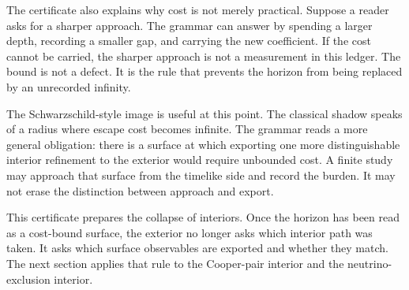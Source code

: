 The certificate also explains why cost is not merely practical. Suppose a
reader asks for a sharper approach. The grammar can answer by spending a
larger depth, recording a smaller gap, and carrying the new coefficient. If
the cost cannot be carried, the sharper approach is not a measurement in
this ledger. The bound is not a defect. It is the rule that prevents the
horizon from being replaced by an unrecorded infinity.

The Schwarzschild-style image is useful at this point. The classical shadow
speaks of a radius where escape cost becomes infinite. The grammar reads a
more general obligation: there is a surface at which exporting one more
distinguishable interior refinement to the exterior would require unbounded
cost. A finite study may approach that surface from the timelike side and
record the burden. It may not erase the distinction between approach and
export.

This certificate prepares the collapse of interiors. Once the horizon has
been read as a cost-bound surface, the exterior no longer asks which
interior path was taken. It asks which surface observables are exported and
whether they match. The next section applies that rule to the Cooper-pair
interior and the neutrino-exclusion interior.
